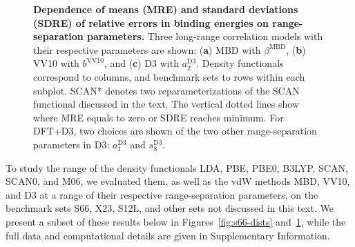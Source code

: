 \begin{figure}
{
}
\caption{\textbf{Dependence of means (MRE) and standard deviations (SDRE) of relative errors in binding energies on range-separation parameters.}
Three long-range correlation models with their respective parameters are shown: (\textbf a) MBD with $\beta^\text{MBD}$, (\textbf b) VV10 with $b^\text{VV10}$, and (\textbf c) D3 with $a_2^\text{D3}$.
Density functionals correspond to columns, and benchmark sets to rows within each subplot.
SCAN* denotes two reparameterizations of the SCAN functional discussed in the text. %
The vertical dotted lines show where MRE equals to zero or SDRE reaches minimum.
For DFT+D3, two choices are shown of the two other range-separation parameters in D3: $a_1^\text{D3}$ and $s_8^\text{D3}$.
}\label{fig:param-fitting}
\end{figure}

To study the range of the density functionals LDA, PBE, PBE0, B3LYP, SCAN, SCAN0, and M06, we evaluated them, as well as the vdW methods MBD, VV10, and D3 at a range of their respective range-separation parameters, on the benchmark sets S66, X23, S12L, and other sets not discussed in this text.
We present a subset of these results below in Figures~\ref{fig:s66-dists} and~\ref{fig:param-fitting}, while the full data and computational details are given in Supplementary Information.

